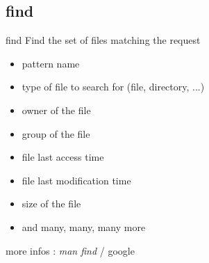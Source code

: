 \subsection{find}
\begin{frame}[fragile]{find}
Find the set of files matching the request
\begin{itemize}
  \pause \item pattern name
  \pause \item type of file to search for (file, directory, ...)
  \pause \item owner of the file
  \pause \item group of the file
  \pause \item file last access time
  \pause \item file last modification time
  \pause \item size of the file
  \pause \item and many, many, many more
\end{itemize}
\pause
more infos : \emph{man find} / google

\end{frame}
